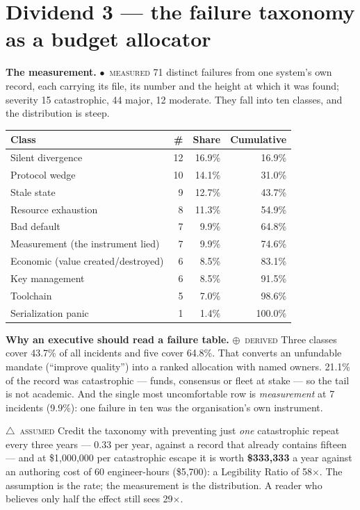 \documentclass[11pt,a4paper]{article}
\newcommand{\derivedv}[1]{\textcolor{sigilviolet}{\textbf{#1}}}
\newcommand{\stM}{\textcolor{sigilcyan}{$\bullet$}~{\scriptsize\textsc{measured}}}
\newcommand{\stD}{\textcolor{sigilviolet}{$\oplus$}~{\scriptsize\textsc{derived}}}
\newcommand{\stA}{\textcolor{sigilamber}{$\triangle$}~{\scriptsize\textsc{assumed}}}
\begin{document}
\section{Dividend 3 --- the failure taxonomy as a budget allocator}\label{sec:d3}


\textbf{The measurement.} \stM{} 71 distinct failures from one system's own record, each carrying its file, its number and the height at which it was found; severity 15 catastrophic, 44 major, 12 moderate. They fall into ten classes, and the distribution is steep.

\begin{center}\small{}\begin{tabularx}{\textwidth}{@{}Xrrr@{}}\toprule
Class & \# & Share & Cumulative \\\midrule
Silent divergence & 12 & 16.9\% & 16.9\% \\
Protocol wedge & 10 & 14.1\% & 31.0\% \\
Stale state & 9 & 12.7\% & 43.7\% \\
Resource exhaustion & 8 & 11.3\% & 54.9\% \\
Bad default & 7 & 9.9\% & 64.8\% \\
Measurement (the instrument lied) & 7 & 9.9\% & 74.6\% \\
Economic (value created/destroyed) & 6 & 8.5\% & 83.1\% \\
Key management & 6 & 8.5\% & 91.5\% \\
Toolchain & 5 & 7.0\% & 98.6\% \\
Serialization panic & 1 & 1.4\% & 100.0\% \\
\bottomrule\end{tabularx}\end{center}


\textbf{Why an executive should read a failure table.} \stD{} Three classes cover 43.7\% of all incidents and five cover 64.8\%. That converts an unfundable mandate (``improve quality'') into a ranked allocation with named owners. 21.1\% of the record was catastrophic --- funds, consensus or fleet at stake --- so the tail is not academic. And the single most uncomfortable row is \emph{measurement} at 7 incidents (9.9\%): one failure in ten was the organisation's own instrument.

\stA{} Credit the taxonomy with preventing just \emph{one} catastrophic repeat every three years --- 0.33 per year, against a record that already contains fifteen --- and at \$1{,}000{,}000 per catastrophic escape it is worth \derivedv{\$333{,}333} a year against an authoring cost of 60 engineer-hours (\$5{,}700): a Legibility Ratio of 58$\times$. The assumption is the rate; the measurement is the distribution. A reader who believes only half the effect still sees 29$\times$.
\end{document}
